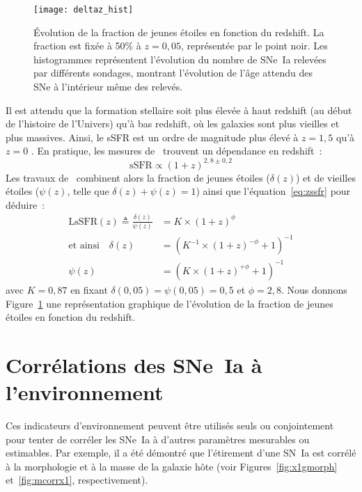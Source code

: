 \documentclass[../main/main.tex]{subfiles}
\begin{document}
\begin{figure}[t]
    \centering
    \texttt{[image: deltaz\_hist]}
    \caption[Évolution de la fraction de jeunes étoiles en fonction du
    redshift]{Évolution de la fraction de jeunes étoiles en fonction du
        redshift. La fraction est fixée à 50\% à $z=0,05$, représentée par le
        point noir. Les histogrammes représentent l'évolution du nombre de
        SNe~Ia relevées par différents sondages, montrant l'évolution de l'âge
    attendu des SNe à l'intérieur même des relevés.}
    \label{fig:deltaz}
\end{figure}

Il est attendu que la formation stellaire soit plus élevée à haut redshift (au
début de l'histoire de l'Univers) qu'à bas redshift, où les galaxies sont plus
vieilles et plus massives. Ainsi, le sSFR est un ordre de magnitude plus élevé à
$z = 1,5$ qu'à $z = 0$ \citep[voir][pour une étude complète]{madau2015}. En
pratique, les mesures de~\cite{tasca2015} trouvent un dépendance en redshift~:
\begin{equation}\label{eq:zssfr}
    \mathrm{sSFR} \propto (1+z)^{2,8 \pm 0,2}
\end{equation}
Les travaux de~\cite{rigault2020} combinent alors la fraction de jeunes étoiles
($\delta(z)$) et de vieilles étoiles ($\psi(z)$, telle que $\delta(z) + \psi(z)
= 1$) ainsi que l'équation~\ref{eq:zssfr} pour déduire~:
\begin{align}\label{eq:dpz}
    \mathrm{LsSFR}(z) \triangleq \frac{\delta(z)}{\psi(z)} &=
    K\times(1+z)^{\phi} \\\label{eq:deltaz}
    \text{et ainsi}\quad
    \delta(z) & = \left( K^{-1}\times(1+z)^{-\phi} +1 \right)^{-1}
    \\\label{eq:psiz}
    \psi(z)   & = \left( K\times(1+z)^{+\phi} +1 \right)^{-1}
\end{align}
avec $K=0,87$ en fixant $\delta(0,05) = \psi(0,05) = 0,5$ et $\phi = 2,8$. Nous
donnons Figure~\ref{fig:deltaz} une représentation graphique de l'évolution de
la fraction de jeunes étoiles en fonction du redshift.

\section{Corrélations des SNe~Ia à l'environnement}\label{sec:envcorr}

Ces indicateurs d'environnement peuvent être utilisés seuls ou conjointement
pour tenter de corréler les SNe~Ia à d'autres paramètres mesurables ou
estimables. Par exemple, il a été démontré que l'étirement d'une SN~Ia est
corrélé à la morphologie et à la masse de la galaxie hôte (voir
Figures~\ref{fig:x1gmorph} et~\ref{fig:mcorrx1}, respectivement).
\end{document}
